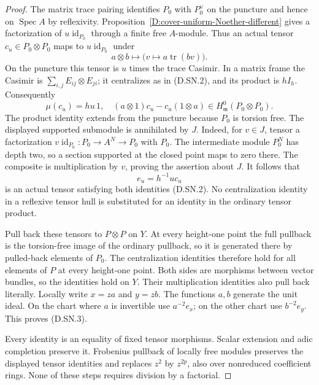 \begin{proof}
The matrix trace pairing identifies $P_0$ with $P_0^\vee$ on the
puncture and hence on $\operatorname{Spec}A$ by reflexivity.
Proposition~\ref{D:cover-uniform-Noether-different} gives a
factorization of $u\operatorname{id}_{P_0}$ through a finite free
$A$-module. Thus an actual tensor $c_u\in P_0\otimes P_0$
maps to $u\operatorname{id}_{P_0}$ under
\[
 a\otimes b\longmapsto
             \bigl(v\longmapsto a\operatorname{tr}(bv)\bigr).
                                                        \tag{D.SN.4}
\]
On the puncture this tensor is $u$ times the trace Casimir. In a
matrix frame the Casimir is
$\sum_{i,j}E_{ij}\otimes E_{ji}$; it centralizes as in
(D.SN.2), and its product is $hI_h$. Consequently
\[
 \mu(c_u)=hu\,1,
 \quad (a\otimes1)c_u-c_u(1\otimes a)
                   \in H^0_{\mathfrak m}(P_0\otimes P_0).
                                                        \tag{D.SN.5}
\]
The product identity extends from the puncture because $P_0$ is
torsion free. The displayed supported submodule is annihilated
by $J$. Indeed, for $v\in J$, tensor a factorization
$v\operatorname{id}_{P_0}:P_0\to A^N\to P_0$ with $P_0$.
The intermediate module $P_0^N$ has depth two, so a section
supported at the closed point maps to zero there. The composite
is multiplication by $v$, proving the assertion about $J$.
It follows that
\[
                          e_u=h^{-1}u c_u              \tag{D.SN.6}
\]
is an actual tensor satisfying both identities (D.SN.2).
No centralization identity in a reflexive tensor hull is
substituted for an identity in the ordinary tensor product.

Pull back these tensors to $P\otimes P$ on $Y$. At every
height-one point the full pullback is the torsion-free image of
the ordinary pullback, so it is generated there by pulled-back
elements of $P_0$. The centralization identities therefore hold
for all elements of $P$ at every height-one point. Both sides
are morphisms between vector bundles, so the identities hold on
$Y$. Their multiplication identities also pull back literally.
Locally write $x=za$ and $y=zb$. The functions $a,b$ generate the
unit ideal. On the chart where $a$ is invertible use $a^{-2}e_x$;
on the other chart use $b^{-2}e_y$. This proves (D.SN.3).

Every identity is an equality of fixed tensor morphisms. Scalar
extension and adic completion preserve it. Frobenius pullback
of locally free modules preserves the displayed tensor identities
and replaces $z^2$ by $z^{2p}$, also over nonreduced coefficient
rings. None of these steps requires division by a factorial.
\end{proof}

